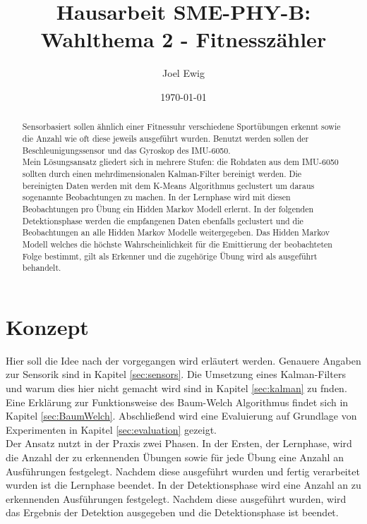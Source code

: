 \documentclass{article}
\begin{document}
\title{Hausarbeit SME-PHY-B: Wahlthema 2 - Fitnesszähler}
\author{Joel Ewig}
\date{\today}
\maketitle
\clearpage

\begin{abstract}
Sensorbasiert sollen ähnlich einer Fitnessuhr verschiedene Sportübungen erkennt sowie die Anzahl wie oft diese jeweils ausgeführt wurden.
Benutzt werden sollen der Beschleunigungssensor und das Gyroskop des IMU-6050.\\
Mein Lösungsansatz gliedert sich in mehrere Stufen:
die Rohdaten aus dem IMU-6050 sollten durch einen mehrdimensionalen Kalman-Filter bereinigt werden.
Die bereinigten Daten werden mit dem K-Means Algorithmus geclustert um daraus sogenannte \glqq{}Beobachtungen\grqq{} zu machen.
In der Lernphase wird mit diesen Beobachtungen pro Übung ein Hidden Markov Modell erlernt.
In der folgenden Detektionsphase werden die empfangenen Daten ebenfalls geclustert und die Beobachtungen an alle Hidden Markov Modelle weitergegeben.
Das Hidden Markov Modell welches die höchste Wahrscheinlichkeit für die Emittierung der beobachteten Folge bestimmt, gilt als Erkenner und die zugehörige Übung wird als ausgeführt behandelt.
\end{abstract}
\clearpage

\tableofcontents
\clearpage

\section{Konzept}
\label{sec:concept}
Hier soll die Idee nach der vorgegangen wird erläutert werden.
Genauere Angaben zur Sensorik sind in Kapitel \ref{sec:sensors}.
Die Umsetzung eines Kalman-Filters und warum dies hier nicht gemacht wird sind in Kapitel \ref{sec:kalman} zu fnden.
Eine Erklärung zur Funktionsweise des Baum-Welch Algorithmus findet sich in Kapitel \ref{sec:BaumWelch}.
Abschließend wird eine Evaluierung auf Grundlage von Experimenten in Kapitel \ref{sec:evaluation} gezeigt.\\


Der Ansatz nutzt in der Praxis zwei Phasen.
In der Ersten, der Lernphase, wird die Anzahl der zu erkennenden Übungen sowie für jede Übung eine Anzahl an Ausführungen festgelegt.
Nachdem diese ausgeführt wurden und fertig verarbeitet wurden ist die Lernphase beendet.
In der Detektionsphase wird eine Anzahl an zu erkennenden Ausführungen festgelegt.
Nachdem diese ausgeführt wurden, wird das Ergebnis der Detektion ausgegeben und die Detektionsphase ist beendet.
\end{document}
